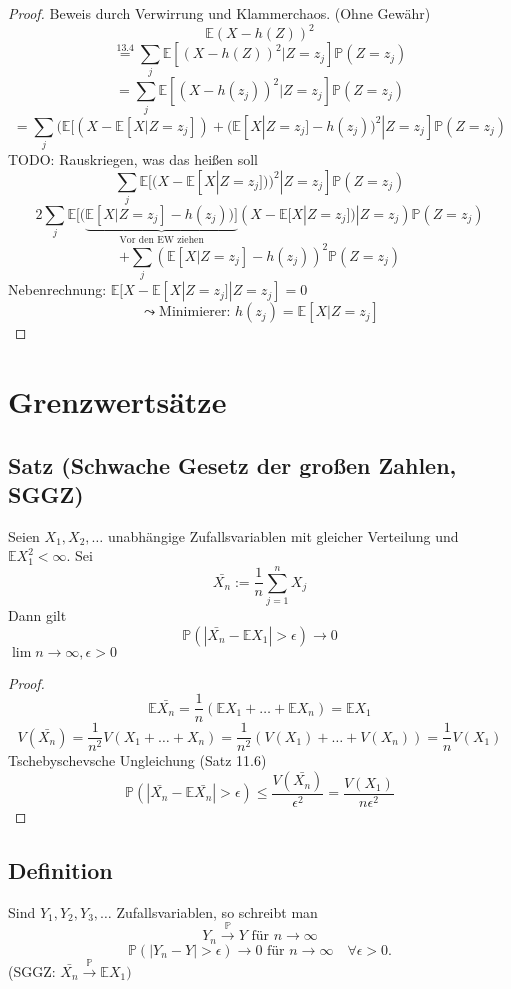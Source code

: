 \documentclass[a4paper,11pt,notitlepage]{report}
\newcommand{\Prim}{{\ensuremath{\mathbb{P}}}}
\newcommand{\E}{{\ensuremath{\mathbb{E}}}}
\begin{document}
\begin{proof} Beweis durch Verwirrung und Klammerchaos. (Ohne Gewähr)
	$$\E (X - h(Z))^2$$
	$$\overset{13.4}{=} \sum\limits_j{\E [(X-h(Z))^2 | Z=z_j] \Prim(Z=z_j)}$$
	$$= \sum\limits_j{\E [(X-h(z_j))^2 | Z=z_j] \Prim(Z=z_j)}$$
	$$= \sum\limits_j{(\E [(X- \E[X | Z=z_j]) + (\E [X | Z = z_j] - h(z_j))^2 | Z = z_j] \Prim(Z=z_j)}$$ TODO: Rauskriegen, was das heißen soll
	$$\sum\limits_j{\E [(X-\E [X|Z=z_j]))^2 | Z = z_j] \Prim(Z=z_j)}$$
	$$2 \sum\limits_j{\E [(\underbrace{\E [X|Z=z_j] - h(z_j))]}_{\text{Vor den EW ziehen}} (X-\E[X|Z=z_j]) | Z = z_j) \Prim(Z=z_j)}$$
	$$ + \sum\limits_j{(\E [X|Z=z_j]- h(z_j))^2 \Prim(Z=z_j)}$$
	Nebenrechnung: $\E[X - \E [X | Z = z_j]| Z = z_j] = 0$
	$$\leadsto \text{Minimierer: } h(z_j) = \E [X | Z = z_j]$$
\end{proof}

\chapter{Grenzwertsätze}

\section{Satz (Schwache Gesetz der großen Zahlen, SGGZ)}

Seien $X_1, X_2, \ldots$ unabhängige Zufallsvariablen mit gleicher Verteilung und $\E X_1 ^2 < \infty$. Sei
$$\bar{X_n} := \frac{1}{n} \sum\limits_{j=1}^n{X_j}$$
Dann gilt
$$\Prim(|\bar{X_n} - \E X_1| > \epsilon) \rightarrow 0$$
$\lim n \rightarrow \infty, \epsilon > 0$

\begin{proof}
	$$\E \bar{X_n} = \frac{1}{n} (\E X_1 + \ldots + \E X_n) = \E X_1$$
	$$V(\bar{X_n}) = \frac{1}{n^2} V(X_1 + \ldots + X_n) = \frac{1}{n^2} (V(X_1) + \ldots + V(X_n)) = \frac{1}{n} V(X_1)$$
	Tschebyschevsche Ungleichung (Satz 11.6)
	$$\Prim(|\bar{X_n}- \E \bar{X_n}| > \epsilon) \leq \frac{V(\bar{X_n})}{\epsilon^2} = \frac{V(X_1)}{n \epsilon^2}$$
\end{proof}

\section{Definition}
Sind $Y_1, Y_2, Y_3, \ldots$ Zufallsvariablen, so schreibt man
$$Y_n \overset{\Prim}{\rightarrow} Y \text{ für } n \rightarrow \infty$$
$$\Prim(|Y_n - Y| > \epsilon) \rightarrow 0 \text{ für } n \rightarrow \infty \quad \forall \epsilon > 0.$$
(SGGZ: $\bar{X_n} \overset{\Prim}{\rightarrow} \E X_1)$
\end{document}
